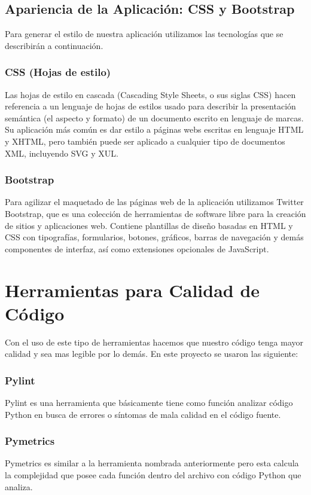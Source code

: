 \subsection{Apariencia de la Aplicación: CSS y Bootstrap}


Para generar el estilo de nuestra aplicación utilizamos las tecnologías que se describirán a continuación.

\subsubsection{CSS (Hojas de estilo)}
Las hojas de estilo en cascada (Cascading Style Sheets, o sus siglas CSS) hacen referencia a un 
lenguaje de hojas de estilos usado para describir la presentación semántica (el aspecto y formato) de un 
documento escrito en lenguaje de marcas. Su aplicación más común es dar estilo a páginas webs escritas en lenguaje HTML y XHTML, 
pero también puede ser aplicado a cualquier tipo de documentos XML, incluyendo SVG y XUL.

\subsubsection{Bootstrap}
Para agilizar el maquetado de las páginas web de la aplicación utilizamos Twitter Bootstrap, que es una colección de herramientas de software
libre para la creación de sitios y aplicaciones web. Contiene plantillas de diseño basadas en HTML y CSS con tipografías, 
formularios, botones, gráficos, barras de navegación y demás componentes de interfaz, así como extensiones opcionales de JavaScript.

\section{Herramientas para Calidad de Código}
\label{2:sec4}

Con el uso de este tipo de herramientas hacemos que nuestro código tenga mayor calidad y sea mas legible por lo demás. En este proyecto se usaron las siguiente:\\
\subsubsection{Pylint}
Pylint es una herramienta que básicamente tiene como función analizar código Python en busca de errores o síntomas de mala calidad en el código fuente.\\ 

\subsubsection{Pymetrics}
Pymetrics es similar a la herramienta nombrada anteriormente pero esta calcula la complejidad que posee cada función dentro del archivo con código Python que analiza.\\
